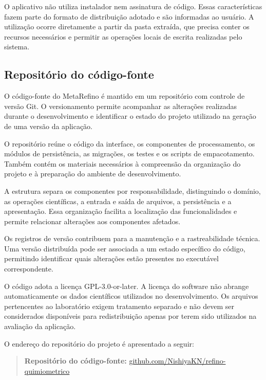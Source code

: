 O aplicativo não utiliza instalador nem assinatura de código. Essas características fazem parte do formato de distribuição adotado e são informadas ao usuário. A utilização ocorre diretamente a partir da pasta extraída, que precisa conter os recursos necessários e permitir as operações locais de escrita realizadas pelo sistema.

\subsection{Repositório do código-fonte}
\label{subsec:repositorio-codigo-fonte}

O código-fonte do MetaRefino é mantido em um repositório com controle de versão Git. O versionamento permite acompanhar as alterações realizadas durante o desenvolvimento e identificar o estado do projeto utilizado na geração de uma versão da aplicação.

O repositório reúne o código da interface, os componentes de processamento, os módulos de persistência, as migrações, os testes e os scripts de empacotamento. Também contém os materiais necessários à compreensão da organização do projeto e à preparação do ambiente de desenvolvimento.

A estrutura separa os componentes por responsabilidade, distinguindo o domínio, as operações científicas, a entrada e saída de arquivos, a persistência e a apresentação. Essa organização facilita a localização das funcionalidades e permite relacionar alterações aos componentes afetados.

Os registros de versão contribuem para a manutenção e a rastreabilidade técnica. Uma versão distribuída pode ser associada a um estado específico do código, permitindo identificar quais alterações estão presentes no executável correspondente.

O código adota a licença GPL-3.0-or-later. A licença do software não abrange automaticamente os dados científicos utilizados no desenvolvimento. Os arquivos pertencentes ao laboratório exigem tratamento separado e não devem ser considerados disponíveis para redistribuição apenas por terem sido utilizados na avaliação da aplicação.

O endereço do repositório do projeto é apresentado a seguir:

\begin{quote}
    \textbf{Repositório do código-fonte:} \url{github.com/NishiyaKN/refino-quimiometrico}
\end{quote}
